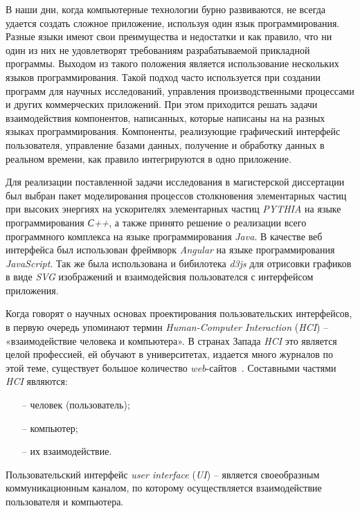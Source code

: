 В наши дни, когда компьютерные технологии бурно развиваются, не
всегда удается создать сложное приложение, используя один язык
программирования. Разные языки имеют свои преимущества и недостатки и как
правило, что ни один из них не удовлетворят требованиям разрабатываемой
прикладной программы. Выходом из такого положения является использование
нескольких языков программирования. Такой подход часто используется при
создании программ для научных исследований, управления производственными
процессами и других коммерческих приложений. При этом приходится решать
задачи взаимодействия компонентов, написанных, которые написаны на на
разных языках программирования. Компоненты, реализующие графический
интерфейс пользователя, управление базами данных, получение и обработку
данных в реальном времени, как правило интегрируются в одно приложение.

Для реализации поставленной задачи исследования в магистерской
диссертации был выбран пакет моделирования процессов столкновения элементарных частиц при высоких энергиях на ускорителях элементарных частиц \textit{PYTHIA} на языке программирования \textit{С++}, а также принято решение о реализации всего программного
комплекса на языке программирования \textit{Java}.
В качестве веб интерфейса был использован фреймворк \textit{Angular} на языке программирования \textit{JavaScript}. Так же была использована и бибилотека \textit{d3js} для отрисовки графиков в виде \textit{SVG} изображений и взаимодейсвия пользователся с интерфейсом приложения.

Когда говорят о научных основах проектирования пользовательских
интерфейсов, в первую очередь упоминают термин \textit{Human-Computer Interaction}
(\textit{HCI}) – «взаимодействие человека и компьютера». В странах Запада \textit{HCI} это
является целой профессией, ей обучают в университетах, издается много
журналов по этой теме, существует большое количество \textit{web}-сайтов~\cite{user-interface}.
Составными частями \textit{HCI} являются:

\begin{enumerate}
	\item[--] человек (пользователь);
	\item[--] компьютер;
	\item[--] их взаимодействие.
\end{enumerate}

Пользовательский интерфейс \textit{user interface} (\textit{UI}) – является своеобразным
коммуникационным каналом, по которому осуществляется взаимодействие
пользователя и компьютера.

